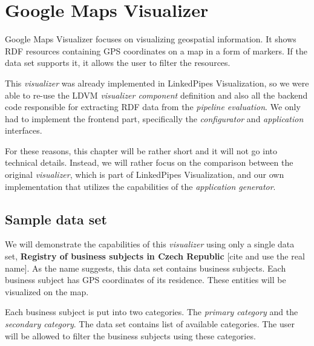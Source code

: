 \section{Google Maps Visualizer}
%
%
%
Google Maps Visualizer focuses on visualizing geospatial information. It shows RDF resources containing GPS coordinates on a map in a form of markers. If the data set supports it, it allows the user to filter the resources.

This \emph{visualizer} was already implemented in LinkedPipes Visualization, so we were able to re-use the LDVM \emph{visualizer component} definition and also all the backend code responsible for extracting RDF data from the \emph{pipeline evaluation}. We only had to implement the frontend part, specifically the \emph{configurator} and \emph{application} interfaces.

For these reasons, this chapter will be rather short and it will not go into technical details. Instead, we will rather focus on the comparison between the original \emph{visualizer}, which is part of LinkedPipes Visualization, and our own implementation that utilizes the capabilities of the \emph{application generator}. 

\subsection{Sample data set}


We will demonstrate the capabilities of this \emph{visualizer} using only a single data set, \textbf{Registry of business subjects in Czech Republic} [cite and use the real name]. As the name suggests, this data set contains business subjects. Each business subject has GPS coordinates of its residence. These entities will be visualized on the map.

Each business subject is put into two categories. The \emph{primary category} and the \emph{secondary category}. The data set contains list of available categories. The user will be allowed to filter the business subjects using these categories.

